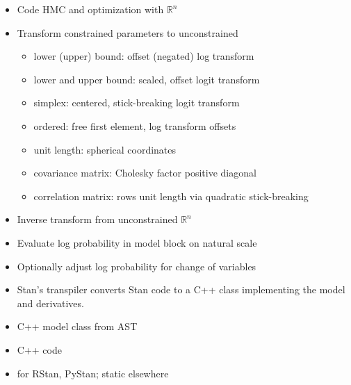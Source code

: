 \documentclass[10pt]{report}
\begin{document}
%
\begin{itemize}
\item Code HMC and optimization with $\mathbb{R}^n$ 
\item Transform constrained parameters to unconstrained
  \vspace*{-2pt}
  {\small
    \begin{itemize}
    \item lower (upper) bound: offset (negated) log transform
    \item lower and upper bound: scaled, offset logit transform
    \item simplex: centered, stick-breaking logit transform
    \item ordered: free first element, log transform offsets
    \item unit length: spherical coordinates
    \item covariance matrix: Cholesky factor positive diagonal
    \item correlation matrix: rows unit length via quadratic stick-breaking
    \end{itemize}
  }
\end{itemize}


%
\begin{itemize}
\item Inverse transform from unconstrained $\mathbb{R}^n$
\item Evaluate log probability in model block on natural scale
\item Optionally adjust log probability for change of variables
\end{itemize}

%
\begin{itemize}
\item Stan's transpiler converts Stan code to a C++ class implementing the model and derivatives.
\item C++ model class  from AST
\item C++ code 
\item {} for RStan, PyStan; static elsewhere
\end{itemize}
\end{document}
